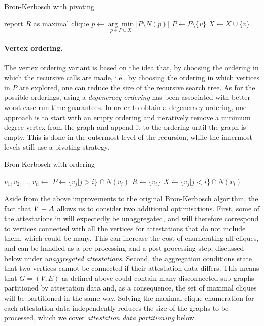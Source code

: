 \documentclass{article}
\begin{document}
\begin{algorithm}[H]
\caption{Bron-Kerbosch with pivoting}
\begin{algorithmic}
  \State report $R$ as maximal clique
\EndIf
\State $p \gets \underset{p \in P \cup X}{\arg\min} |P \setminus N(p)|$
  \State {}
  \State $P \gets P \setminus \{v\}$
  \State $X \gets X \cup \{v\}$
\EndFor
\EndProcedure
\end{algorithmic}
\end{algorithm}

\paragraph{Vertex ordering.}
%
The vertex ordering variant is based on the idea that, by choosing the ordering
in which the recursive calls are made, i.e., by choosing the ordering in which
vertices in $P$ are explored, one can reduce the size of the recursive search
tree. As for the possible orderings, using a \emph{degeneracy ordering} has
been associated with better worst-case run time guarantees. In order to obtain
a degeneracy ordering, one approach is to start with an empty ordering and
iteratively remove a minimum degree vertex from the graph and append it to the
ordering until the graph is empty. This is done in the outermost level of the
recursion, while the innermost levels still use a pivoting strategy.

\begin{algorithm}[H]
\caption{Bron-Kerbosch with ordering}
\begin{algorithmic}
\State $v_1, v_2, \dots, v_n \gets$ 
  \State $P \gets \{ v_j | j > i\} \cap N(v_i)$
  \State $R \gets \{ v_i \}$
  \State $X \gets \{ v_j | j < i\} \cap N(v_i)$
  \State {}
\EndFor
\EndProcedure
\end{algorithmic}
\end{algorithm}

Aside from the above improvements to the original Bron-Kerbosch algorithm, the
fact that $V = A{}$ allows us to consider two additional
optimisations. First, some of the attestations in \attestations{} will
expectedly be unaggregated, and will therefore correspond to vertices connected
with all the vertices for attestations that do not include them, which could be
many. This can increase the cost of enumerating all cliques, and can be handled
as a pre-processing and a post-processing step, discussed below under
\emph{unaggregated attestations}. Second, the aggregation conditions state that
two vertices cannot be connected if their attestation data differs.  This means
that $G = (V,E)$ as defined above could contain many disconnected sub-graphs
partitioned by attestation data and, as a consequence, the set of maximal
cliques will be partitioned in the same way. Solving the maximal clique
enumeration for each attestation data independently reduces the size of the
graphs to be processed, which we cover \emph{attestation data partitioning}
below.
\end{document}
